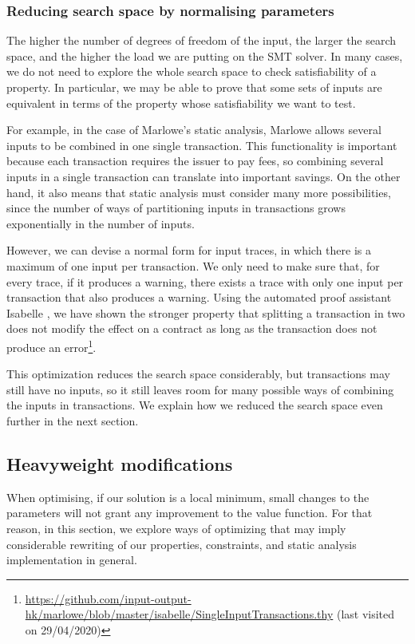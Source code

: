 \documentclass[english,runningheads]{llncs}
\begin{document}
\subsubsection{Reducing search space by normalising parameters\label{subsec:Reducing-search-space-by-normalising-parameters}}

The higher the number of degrees of freedom of the input, the larger
the search space, and the higher the load we are putting on the SMT
solver. In many cases, we do not need to explore the whole search
space to check satisfiability of a property. In particular, we may
be able to prove that some sets of inputs are equivalent in terms
of the property whose satisfiability we want to test.

For example, in the case of Marlowe's static analysis,
Marlowe allows several inputs to be combined in one single transaction.
This functionality is important because each transaction requires
the issuer to pay fees, so combining several inputs in a single transaction
can translate into important savings. On the other hand, it also means
that static analysis must consider many more possibilities, since
the number of ways of partitioning inputs in transactions grows exponentially
in the number of inputs.

However, we can devise a normal form for input traces, in which there
is a maximum of one input per transaction. We only need to make sure
that, for every trace, if it produces a warning, there exists a trace
with only one input per transaction that also produces a warning.
Using the automated proof assistant Isabelle \cite{nipkow2002isabelle},
we have shown the stronger property that splitting a transaction in
two does not modify the effect on a contract as long as the transaction
does not produce an error\footnote{\url{https://github.com/input-output-hk/marlowe/blob/master/isabelle/SingleInputTransactions.thy}
(last visited on 29/04/2020)}.

This optimization reduces the search space considerably, but transactions
may still have no inputs, so it still leaves room for many possible
ways of combining the inputs in transactions. We explain how we reduced
the search space even further in the next section. 

\subsection{Heavyweight modifications \label{subsec:Heavyweight-modifications}}

When optimising, if our solution is a local minimum, small changes
to the parameters will not grant any improvement to the value function.
For that reason, in this section, we explore ways of optimizing that
may imply considerable rewriting of our properties, constraints, and
static analysis implementation in general.
\end{document}
